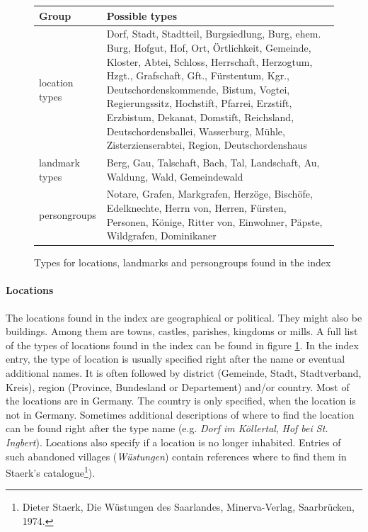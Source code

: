 \begin{figure}[h]
\centering
\begin{tabular}{|l|p{10cm}|}
\hline
\textbf{Group}        & \textbf{Possible types}  \\
\hline
location types & Dorf, Stadt, Stadtteil, Burgsiedlung, Burg,  ehem. Burg, Hofgut, Hof, Ort, Örtlichkeit, Gemeinde, Kloster,   Abtei, Schloss, Herrschaft, Herzogtum, Hzgt., Grafschaft,    Gft., Fürstentum, Kgr., Deutschordenskommende, Bistum,     Vogtei, Regierungssitz, Hochstift, Pfarrei, Erzstift, Erzbistum, Dekanat, Domstift, Reichsland, Deutschordensballei, Wasserburg, Mühle, Zisterzienserabtei, Region, Deutschordenshaus \\
\hline
landmark types & Berg, Gau, Talschaft, Bach, Tal, Landschaft, Au, Waldung, Wald, Gemeindewald \\
\hline
persongroups   & Notare, Grafen, Markgrafen, Herzöge, Bischöfe, Edelknechte, Herrn von, Herren, Fürsten, Personen, Könige, Ritter von, Einwohner, Päpste, Wildgrafen, Dominikaner \\
\hline
\end{tabular} 
\caption{Types for locations, landmarks and persongroups found in the index}
\label{fig:location-list}
\end{figure}

\paragraph{Locations}
The locations found in the index are geographical or political. They might also be buildings. Among them are towns, castles, parishes, kingdoms or mills. A full list of the types of locations found in the index can be found in figure \ref{fig:location-list}. In the index entry, the type of location is usually specified right after the name or eventual additional names. It is often followed by district (Gemeinde, Stadt, Stadtverband, Kreis), region (Province, Bundesland or Departement) and/or country. Most of the locations are in Germany. The country is only specified, when the location is not in Germany. Sometimes additional descriptions of where to find the location can be found right after the type name (e.g. \textit{Dorf im Köllertal}, \textit{Hof bei St. Ingbert}). Locations also specify if a location is no longer inhabited. Entries of such abandoned villages (\textit{Wüstungen}) contain references where to find them in Staerk's catalogue\footnote{Dieter Staerk, Die Wüstungen des Saarlandes, Minerva-Verlag, Saarbrücken, 1974.}). %

